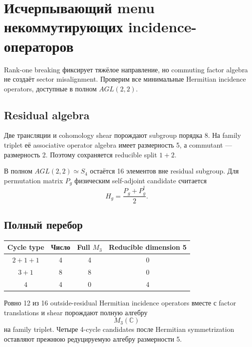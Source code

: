 \chapter{Исчерпывающий menu некоммутирующих incidence-операторов}

Rank-one breaking фиксирует тяжёлое направление, но commuting factor algebra
не создаёт sector misalignment. Проверим все минимальные Hermitian incidence
operators, доступные в полном \(AGL(2,2)\).

\section{Residual algebra}

Две трансляции и cohomology shear порождают subgroup порядка 8. На family
triplet её associative operator algebra имеет размерность 5, а commutant ---
размерность 2. Поэтому сохраняется reducible split \(1+2\).

В полном \(AGL(2,2)\simeq S_4\) остаётся 16 элементов вне residual subgroup.
Для permutation matrix \(P_g\) физическим self-adjoint candidate считается
\begin{equation}
H_g=\frac{P_g+P_g^\dagger}{2}.
\end{equation}

\section{Полный перебор}

\begin{center}
\begin{tabular}{cccc}
\toprule
Cycle type & Число & Full \(M_3\) & Reducible dimension 5 \\
\midrule
\(2+1+1\) & 4 & 4 & 0 \\
\(3+1\) & 8 & 8 & 0 \\
\(4\) & 4 & 0 & 4 \\
\bottomrule
\end{tabular}
\end{center}

\begin{theorem}
Ровно 12 из 16 outside-residual Hermitian incidence operators вместе с
factor translations и shear порождают полную алгебру
\begin{equation}
M_3(\mathbb C)
\end{equation}
на family triplet. Четыре 4-cycle candidates после Hermitian symmetrization
оставляют прежнюю редуцируемую алгебру размерности 5.
\end{theorem}

